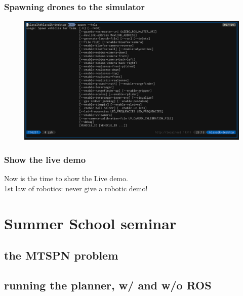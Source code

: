 \documentclass[aspectratio=1610]{beamer}
\begin{document}
\begin{frame}
  \frametitle{Spawning drones to the simulator}

  \begin{figure}
    \includegraphics[width=1.0\textwidth]{./fig/spawn.png}
  \end{figure}

\end{frame}

\begin{frame}
  \frametitle{Show the live demo}

  \begin{center}
    \large Now is the time to show the Live demo.\\
    \vspace{2em}
    1st law of robotics: never give a robotic demo!
  \end{center}

\end{frame}


\section{Summer School seminar}
\subsection{the MTSPN problem}
\subsection{running the planner, w/ and w/o ROS}

\end{document}
